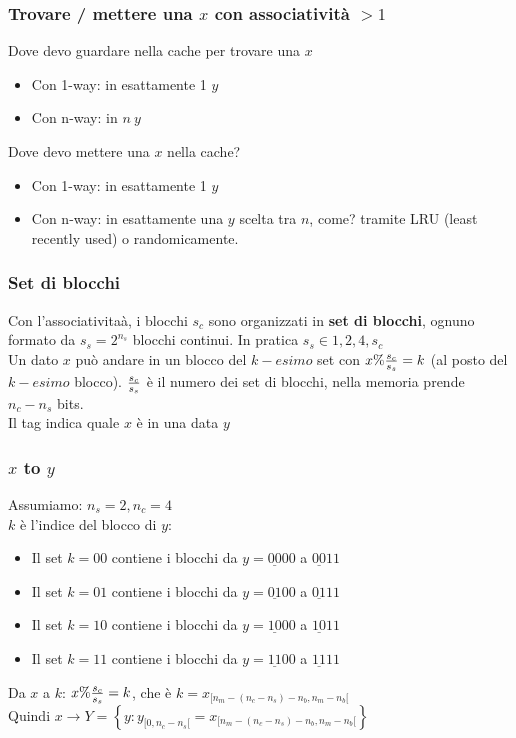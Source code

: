 \documentclass[12pt,a4paper]{article}
\begin{document}
\subsubsection{Trovare / mettere una $x$ con associatività $> 1$}
Dove devo guardare nella cache per trovare una $x$
\begin{itemize}
\item Con 1-way: in esattamente 1 $y$
\item Con n-way: in $n\ y$
\end{itemize}
Dove devo mettere una $x$ nella cache?
\begin{itemize}
\item Con 1-way: in esattamente 1 $y$
\item Con n-way: in esattamente una $y$ scelta tra $n$, come? tramite LRU (least recently used) o randomicamente.
\end{itemize}

\subsubsection{Set di blocchi}
Con l'associativitaà, i blocchi $s_c$ sono organizzati in \textbf{set di blocchi}, ognuno formato da $s_s=2^{n_s}$ blocchi continui. In pratica $s_s \in 1,2,4, s_c$\\
Un dato $x$ può andare in un blocco del $k-esimo$ set con $x\%{s_c \over s_s} = k$ (al posto del $k-esimo$ blocco). ${s_c \over s_s}$ è il numero dei set di blocchi, nella memoria prende $n_c-n_s$ bits.\\
Il tag indica quale $x$ è in una data $y$

\subsubsection{$x$ to $y$}
Assumiamo: $n_s=2, n_c=4$\\
$k$ è l'indice del blocco di $y$:
\begin{itemize}
\item Il set $k = 00$ contiene i blocchi da $y=\underline{00}00$ a $\underline{00}11$
\item Il set $k = 01$ contiene i blocchi da $y=\underline{01}00$ a $\underline{01}11$
\item Il set $k = 10$ contiene i blocchi da $y=\underline{10}00$ a $\underline{10}11$
\item Il set $k = 11$ contiene i blocchi da $y=\underline{11}00$ a $\underline{11}11$
\end{itemize}
Da $x$ a $k$: $x\%{s_c \over s_s}=k$, che è $k=x_{[n_m-(n_c-n_s)-n_b,n_m-n_b[}$\\
Quindi $x \rightarrow Y=\left\{y:y_{[0,n_c-n_s[} = x_{[n_m-(n_c-n_s)-n_b,n_m-n_b[}\right\}$
\end{document}
